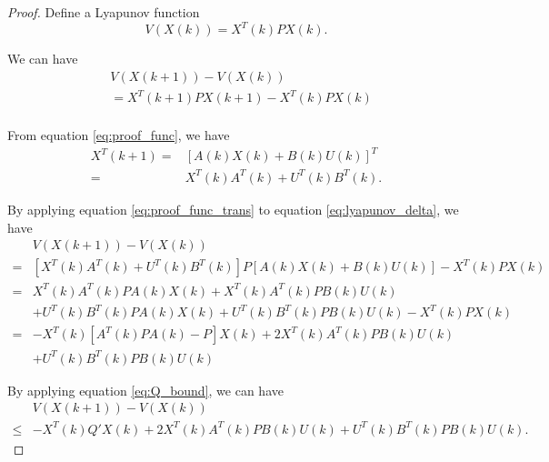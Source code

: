 \begin{proof}
Define a Lyapunov function
\begin{equation}
\label{eq:lyapunov_v}
V( X(k) ) = X^{T} (k) P X(k).
\end{equation}

We can have
\begin{equation}
\label{eq:lyapunov_delta}
\begin{aligned}
& V( X(k+1) ) - V( X(k) ) \\
& = X^{T}(k+1) P X(k+1) - X^{T}(k) P X(k) \\ 
\end{aligned}
\end{equation}

From equation \eqref{eq:proof_func}, we have
\begin{equation}
\label{eq:proof_func_trans}
\begin{aligned}
X^{T}(k+1) = & [ A(k) X(k) + B(k) U(k) ]^{T} \\
= & X^{T}(k)  A^{T}(k) + U^{T}(k) B^{T}(k).
\end{aligned}
\end{equation}

By applying equation \eqref{eq:proof_func_trans} to equation \eqref{eq:lyapunov_delta}, we have
\begin{equation}
\label{eq:lyapunov_delta2}
\begin{aligned}
& V( X(k+1) ) - V( X(k) ) \\
= & [ X^{T}(k)  A^{T}(k) + U^{T}(k) B^{T}(k) ] P [ A(k) X(k) + B(k) U(k) ] - X^{T}(k) P X(k) \\
= & X^{T}(k)  A^{T}(k) P A(k) X(k) +  X^{T}(k)  A^{T}(k) P B(k) U(k) \\
& + U^{T}(k) B^{T}(k) P A(k) X(k) + U^{T}(k) B^{T}(k) P B(k) U(k) - X^{T}(k) P X(k) \\
= & - X^{T}(k) [ A^{T}(k) P A(k) - P ] X(k) + 2 X^{T}(k)  A^{T}(k) P B(k) U(k) \\
& + U^{T}(k) B^{T}(k) P B(k) U(k)
\end{aligned}
\end{equation}

By applying equation \eqref{eq:Q_bound}, we can have
\begin{equation}
\label{eq:lyapunov_delta3}
\begin{aligned}
& V( X(k+1) ) - V( X(k) ) \\
\leq & - X^{T}(k) Q' X(k) + 2 X^{T}(k)  A^{T}(k) P B(k) U(k) + U^{T}(k) B^{T}(k) P B(k) U(k).
\end{aligned}
\end{equation}


\end{proof}
